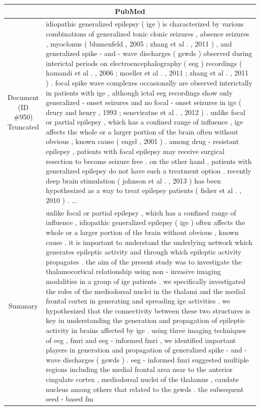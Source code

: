 \begin{table}[h!]
\begin{tabular}{c|p{}}
  \multicolumn{2}{c}{PubMed} \\\hline
  \makecell{Document\\(ID \#950)\\Truncated} & idiopathic generalized epilepsy ( ige ) is characterized by various combinations of generalized tonic clonic seizures , absence seizures , myoclonus ( blumenfeld , 2005 ; zhang et al . , 2011 ) , and generalized spike - and - wave discharges ( gswds ) observed during interictal periods on electroencephalography ( eeg ) recordings ( hamandi et al . , 2006 ; moeller et al . , 2011 ; zhang et al . , 2011 ) . focal spike wave complexes occasionally are observed interictally in patients with ige , although ictal eeg recordings show only generalized - onset seizures and no focal - onset seizures in ige ( drury and henry , 1993 ; seneviratne et al . , 2012 ) . unlike focal or partial epilepsy , which has a confined range of influence , ige affects the whole or a larger portion of the brain often without obvious , known cause ( engel , 2001 ) . among drug - resistant epilepsy , patients with focal epilepsy may receive surgical resection to become seizure free . on the other hand , patients with generalized epilepsy do not have such a treatment option . recently deep brain stimulation ( johnson et al . , 2013 ) has been hypothesized as a way to treat epilepsy patients ( fisher et al . , 2010 ) . ... \\\hline
  Summary & unlike focal or partial epilepsy , which has a confined range of influence , idiopathic generalized epilepsy ( ige ) often affects the whole or a larger portion of the brain without obvious , known cause . it is important to understand the underlying network which generates epileptic activity and through which epileptic activity propagates . the aim of the present study was to investigate the thalamocortical relationship using non - invasive imaging modalities in a group of ige patients . we specifically investigated the roles of the mediodorsal nuclei in the thalami and the medial frontal cortex in generating and spreading ige activities . we hypothesized that the connectivity between these two structures is key in understanding the generation and propagation of epileptic activity in brains affected by ige . using three imaging techniques of eeg , fmri and eeg - informed fmri , we identified important players in generation and propagation of generalized spike - and - wave discharges ( gswds ) . eeg - informed fmri suggested multiple regions including the medial frontal area near to the anterior cingulate cortex , mediodorsal nuclei of the thalamus , caudate nucleus among others that related to the gswds . the subsequent seed - based fm \\\hline

\end{tabular}
\end{table}
